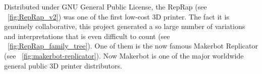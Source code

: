 \begin{figure}[]
\centering
    \hfil
    \caption{}
    \label{fig:RepRap_project}
\end{figure}


Distributed under GNU General Public License, the RepRap (see \figurename~\ref{fig:RepRap_v2}) was one of the first low-cost 3D printer. The fact it is genuinely collaborative, this project generated a so large number of variations and interpretations that is even difficult to count (see \figurename~\ref{fig:RepRap_family_tree}). One of them is the now famous Makerbot Replicator (see \figurename~\ref{fig:makerbot-replicator}). Now Makerbot is one of the major worldwide general public 3D printer distributors.


